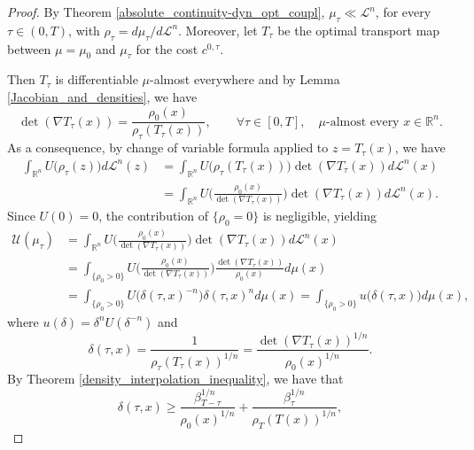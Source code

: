 \documentclass[10pt,a4paper]{amsart}
\begin{document}
		\begin{proof}
			By Theorem \ref{absolute_continuity-dyn_opt_coupl}, $\mu_\tau\ll\mathscr{L}^n$, for every $\tau\in (0,T)$, with $\rho_\tau=d\mu_\tau/d\mathscr{L}^n$. Moreover, let $T_\tau$ be the optimal transport map between $\mu=\mu_0$ and $\mu_\tau$ for the cost $c^{0,\tau}$.
            
			Then $T_\tau$ is differentiable $\mu$-almost everywhere and by Lemma \ref{Jacobian_and_densities}, we have 
			\begin{equation}
				\det(\nabla T_\tau(x))=\frac{\rho_0(x)}{\rho_\tau(T_\tau(x))},\qquad\forall \tau\in[0,T],\quad\mu\text{-almost every }x\in\mathbb{R}^n.
			\end{equation}
			As a consequence, by change of variable formula applied to $z=T_\tau(x)$, we have 
			\begin{align}
				\int_{\mathbb{R}^n}U\big(\rho_\tau(z)\big)d\mathscr{L}^n(z)&=\int_{\mathbb{R}^n}U\big(\rho_\tau(T_\tau(x))\big)\det(\nabla T_\tau(x))d\mathscr{L}^n(x)\\
				&=\int_{\mathbb{R}^n}U\bigg(\frac{\rho_0(x)}{\det(\nabla T_\tau(x))}\bigg)\det(\nabla T_\tau(x))d\mathscr{L}^n(x).
			\end{align}
			Since $U(0)=0$, the contribution of $\{\rho_0=0\}$ is negligible, yielding 
			\begin{align}
				\mathcal{U}(\mu_\tau)&=\int_{\mathbb{R}^n}U\bigg(\frac{\rho_0(x)}{\det(\nabla T_\tau(x))}\bigg)\det(\nabla T_\tau(x))d\mathscr{L}^n(x)\\
				&=\int_{\{\rho_0>0\}}U\bigg(\frac{\rho_0(x)}{\det(\nabla T_\tau(x))}\bigg)\frac{\det(\nabla T_\tau(x))}{\rho_0(x)}d\mu(x)\\
				&=\int_{\{\rho_0>0\}}U\big(\delta(\tau,x)^{-n}\big)\delta(\tau,x)^{n}d\mu(x)
                =\int_{\{\rho_0>0\}}u\big(\delta(\tau,x)\big)d\mu(x),
			\end{align}
			where $u(\delta)=\delta^{n}U(\delta^{-n})$ and 
			\begin{equation}
				\delta(\tau,x)=\frac{1}{\rho_\tau(T_\tau(x))^{1/n}}=\frac{\det(\nabla T_\tau(x))^{1/n}}{\rho_0(x)^{1/n}}.
			\end{equation} 
			By Theorem \ref{density_interpolation_inequality}, we have that
			\begin{equation}
				\delta(\tau,x)\geq\frac{\beta_{T-\tau}^{1/n}}{\rho_0(x)^{1/n}} +\frac{\beta_{\tau}^{1/n}}{\rho_T(T(x))^{1/n}},

\end{equation}
\end{proof}
\end{document}
